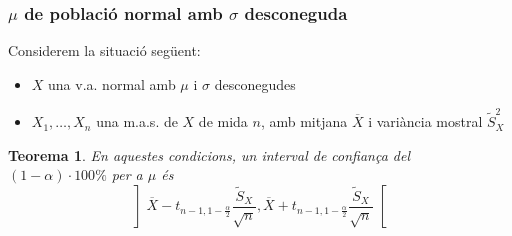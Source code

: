 \documentclass[12pt,t]{beamer}
\theoremstyle{plain}
\newtheorem{teorema}{Teorema}
\theoremstyle{definition}
\begin{document}
\begin{frame}
\frametitle{$\mu$ de població normal amb $\sigma$ desconeguda}

Considerem  la situació següent:
\begin{itemize}
\item  $X$ una v.a.  normal amb $\mu$ i $\sigma$ desconegudes

\item $X_1,\ldots,X_n$ una m.a.s. de $X$  de mida $n$, amb mitjana $\overline{X}$ i variància mostral $\widetilde{S}_X^2$
\end{itemize}


\begin{teorema}
En aquestes condicions, un interval  de confiança del $(1-\alpha)\cdot 100\%$ per a $\mu$
és  
$$
\left] 
\overline{X}-t_{n-1,1-\frac{\alpha}{2}} \frac{\widetilde{S}_{X}}{\sqrt{n}},
\overline{X}+t_{n-1,1-\frac{\alpha}{2}}\frac{\widetilde{S}_{X}}{\sqrt{n}} \right[
$$
\end{teorema}

\end{frame}

%
%
%
%
%
%
%
%
%
%
\end{document}
